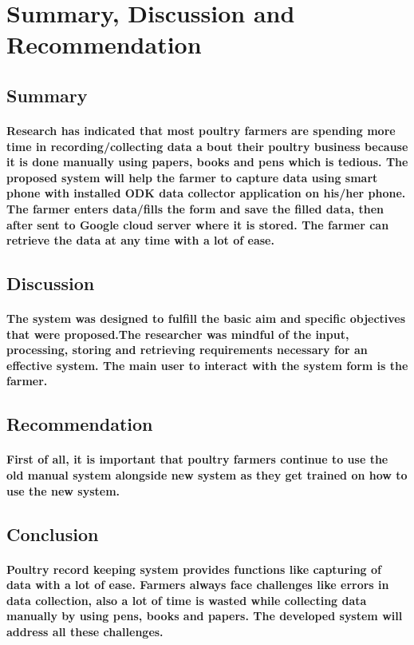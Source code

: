 \documentclass[10pt,a4paper]{article}
\begin{document}
\section{Summary, Discussion and Recommendation}
\subsection{Summary}
\paragraph{Research has indicated that most poultry farmers are spending more time in recording/collecting data a bout their poultry business because it is done manually using papers, books and pens which is tedious. The proposed system will help the farmer to capture data using smart phone with installed ODK data collector application on his/her phone. The farmer enters data/fills the form and save the filled data, then after sent to Google cloud server where it is stored. The farmer can retrieve the data at any time with a lot of ease.}

\subsection{Discussion}
\paragraph{The system was designed to fulfill the basic aim and specific objectives that were proposed.The researcher was mindful of the input, processing, storing and retrieving requirements necessary for an effective system. The main user to interact with the system form is the farmer.}

\subsection{Recommendation}
\paragraph{First of all, it is important that poultry farmers continue to use the old manual system alongside new system as they get trained on how to use the new system.}

\subsection{Conclusion}
\paragraph{Poultry record keeping system provides functions like capturing of data with a lot of ease. Farmers always face challenges like errors in data collection, also a lot of time is wasted while collecting data manually by using pens, books and papers.  The developed system will address all these challenges.} 
\end{document}
